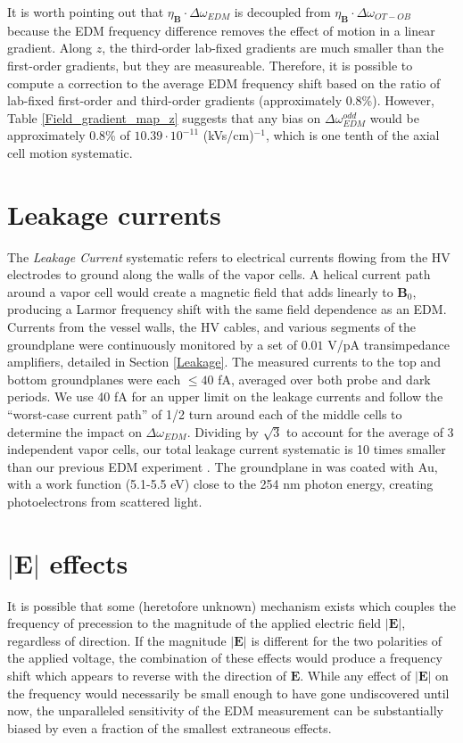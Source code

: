 \documentclass [10pt, twoside] {uwthesis}[2012/04/02]
\begin{document}
It is worth pointing out that $\eta_{\mathbf{B}}\cdot\Delta\omega_{EDM}$ is decoupled from  $\eta_{\mathbf{B}}\cdot\Delta\omega_{OT-OB}$ because the EDM frequency difference removes the effect of motion in a linear gradient. Along $z$, the third-order lab-fixed gradients are much smaller than the first-order gradients, but they are measureable. Therefore, it is possible to compute a correction to the average EDM frequency shift based on the ratio of lab-fixed first-order and third-order gradients (approximately 0.8\%). However, Table \ref{Field_gradient_map_z} suggests that any bias on $\Delta\omega^{odd}_{EDM}$ would be approximately 0.8\% of $10.39\cdot 10^{-11}$ (kVs/cm)$^{-1}$, which is one tenth of the axial cell motion systematic.

\section{Leakage currents}
The \textit{Leakage Current} systematic refers to electrical currents flowing from the HV electrodes to ground along the walls of the vapor cells. A helical current path around a vapor cell would create a magnetic field that adds linearly to $\mathbf{B}_0$, producing a Larmor frequency shift with the same field dependence as an EDM. Currents from the vessel walls, the HV cables, and various segments of the groundplane were continuously monitored by a set of $0.01$ V/pA transimpedance amplifiers, detailed in Section \ref{Leakage}. The measured currents to the top and bottom groundplanes were each $\le 40$ fA, averaged over both probe and dark periods. We use 40 fA for an upper limit on the leakage currents and follow the ``worst-case current path'' of 1/2 turn around each of the middle cells to determine the impact on $\Delta\omega_{EDM}$. Dividing by $\sqrt{3}$ to account for the average of 3 independent vapor cells, our total leakage current systematic is 10 times smaller than our previous EDM experiment \cite{2013_Hg_EDM_PRA}. The groundplane in \cite{2013_Hg_EDM_PRA} was coated with Au, with a work function (5.1-5.5 eV) close to the 254 nm photon energy, creating photoelectrons from scattered light.

\section{$|\mathbf{E}|$ effects} \label{|E|_effects}
It is possible that some (heretofore unknown) mechanism exists which couples the frequency of precession to the magnitude of the applied electric field $|\mathbf{E}|$, regardless of direction. If the magnitude $|\mathbf{E}|$ is different for the two polarities of the applied voltage, the combination of these effects would produce a frequency shift which appears to reverse with the direction of $\mathbf{E}$. While any effect of $|\mathbf{E}|$ on the frequency would necessarily be small enough to have gone undiscovered until now, the unparalleled sensitivity of the EDM measurement can be substantially biased by even a fraction of the smallest extraneous effects. 
\end{document}
